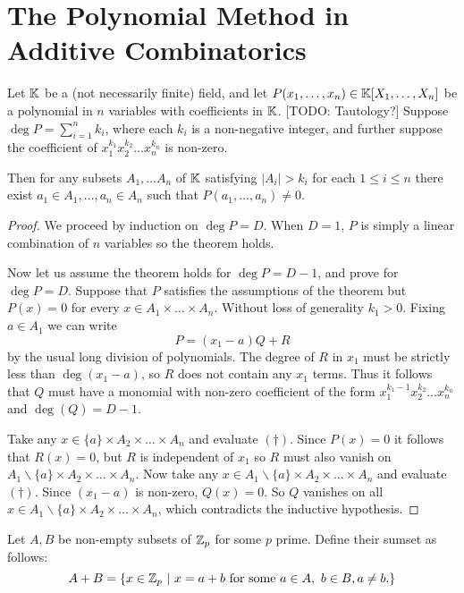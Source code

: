 \chapter{The Polynomial Method in Additive Combinatorics}

\begin{theorem}
    Let $\mathbb K$ be a (not necessarily finite) field, and let $P(x_1,\dots, x_n) \in \mathbb K[X_1,\dots, X_n]$ be a polynomial in $n$ variables with coefficients in $\mathbb K$. [TODO: Tautology?] Suppose $\deg P = \sum_{i=1}^n k_i$, where each $k_i$ is a non-negative
    integer, and further suppose the coefficient of $x_1^{k_1}x_2^{k_2}\dots x_n^{k_n}$ is non-zero.

    Then for any subsets $A_1,\dots A_n$ of $\mathbb K$ satisfying $|A_i| > k_i$ for each $1\leq i\leq n$ there exist $a_1 \in A_1, \dots, a_n \in A_n$ such that $P(a_1,\dots, a_n) \neq 0$.
    
\end{theorem}
\begin{proof}
    We proceed by induction on $\deg P = D$. When $D=1$, $P$ is simply a linear combination of $n$ variables so the theorem holds.

    Now let us assume the theorem holds for $\deg P = D -1$, and prove for $\deg P = D$.
    Suppose that $P$ satisfies the assumptions of the theorem but $P(x) = 0$ for every $x \in A_1 \times \dots \times A_n$.
    Without loss of generality $k_1 > 0.$ Fixing $a\in A_1$ we can write
    \[
    P = (x_1-a)Q +R  \tag{$\dagger$}
    \]
    by the usual long division of polynomials. The degree of $R$ in $x_1$ must be strictly less than $\deg(x_1-a)$, so $R$ does not contain any
    $x_1$ terms. Thus it follows that $Q$ must have a monomial with non-zero coefficient of the form $x_1^{k_{1} -1} x_2^{k_2} \dots x_n^{k_n}$ and 
    $\deg (Q) = D-1$.

    Take any $x \in \{a\} \times A_2 \times \dots \times A_n$ and evaluate $(\dagger)$. Since $P(x) = 0$ it follows that $R(x) = 0$, but $R$ is independent of $x_1$ so $R$ must also vanish on $A_1 \backslash \{a\} \times A_2 \times \dots \times A_n$.
    Now take any $x \in A_1 \backslash \{a\} \times A_2 \times \dots \times A_n$ and evaluate $(\dagger)$. Since $(x_1 - a)$ is non-zero, $Q(x) =0$. So $Q$ vanishes on all $x \in A_1 \backslash \{a\} \times A_2 \times \dots \times A_n$, which contradicts the inductive hypothesis.
\end{proof}

\begin{theorem} 
    Let $A,B$ be non-empty subsets of $\mathbb Z_p$ for some $p$ prime. Define their sumset as follows:
    \[
    A + B = 
    \left\{ x \in \mathbb Z_p\ | \ x = a+b \text{  for some } a\in A, \ b \in B, a\neq b. \right\}
    \]
\end{theorem}